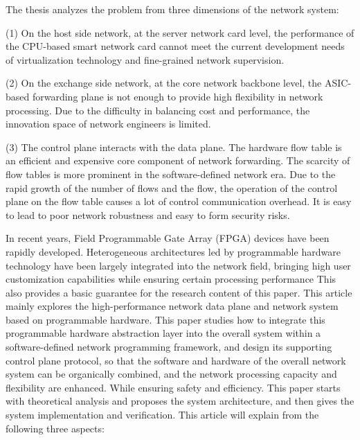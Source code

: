 \noindent The thesis analyzes the problem from three dimensions of the network system: \newline

\noindent (1) On the host side network, at the server network card level, the performance of the CPU-based smart network card cannot meet the current development needs of virtualization technology and fine-grained network supervision. \newline

\noindent (2) On the exchange side network, at the core network backbone level, the ASIC-based forwarding plane is not enough to provide high flexibility in network processing. Due to the difficulty in balancing cost and performance, the innovation space of network engineers is limited. \newline

\noindent (3) The control plane interacts with the data plane. The hardware flow table is an efficient and expensive core component of network forwarding. The scarcity of flow tables is more prominent in the software-defined network era. Due to the rapid growth of the number of flows and the flow, the operation of the control plane on the flow table causes a lot of control communication overhead. It is easy to lead to poor network robustness and easy to form security risks. \newline

\noindent In recent years, Field Programmable Gate Array (FPGA) devices have been rapidly developed. Heterogeneous architectures led by programmable hardware technology have been largely integrated into the network field, bringing high user customization capabilities while ensuring certain processing performance This also provides a basic guarantee for the research content of this paper.
This article mainly explores the high-performance network data plane and network system based on programmable hardware. This paper studies how to integrate this programmable hardware abstraction layer into the overall system within a software-defined network programming framework, and design its supporting control plane protocol, so that the software and hardware of the overall network system can be organically combined, and the network processing capacity and flexibility are enhanced. While ensuring safety and efficiency. This paper starts with theoretical analysis and proposes the system architecture, and then gives the system implementation and verification. This article will explain from the following three aspects: \newline

